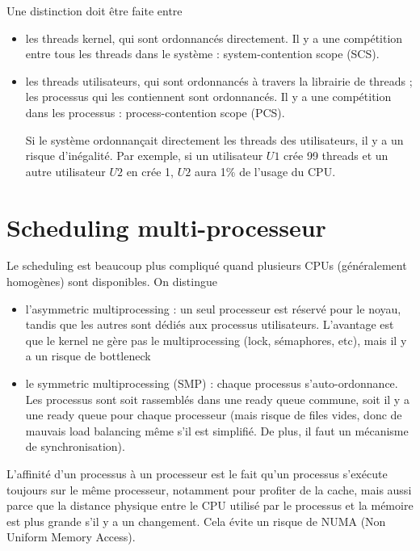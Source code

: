 Une distinction doit être faite entre

\begin{itemize}
	\item les threads kernel, qui sont ordonnancés directement. Il y a une compétition entre tous les threads dans le système : system-contention scope (SCS).
	\item les threads utilisateurs, qui sont ordonnancés à travers la librairie de threads ; les processus qui les contiennent sont ordonnancés. Il y a une compétition dans les processus : process-contention scope (PCS).
	
	Si le système ordonnançait directement les threads des utilisateurs, il y a un risque d'inégalité. Par exemple, si un utilisateur $U1$ crée 99 threads et un autre utilisateur $U2$ en crée 1, $U2$ aura 1\% de l'usage du CPU.
\end{itemize}

\section{Scheduling multi-processeur}

Le scheduling est beaucoup plus compliqué quand plusieurs CPUs (généralement homogènes) sont disponibles. On distingue

\begin{itemize}
	\item l'asymmetric multiprocessing : un seul processeur est réservé pour le noyau, tandis que les autres sont dédiés aux processus utilisateurs. L'avantage est que le kernel ne gère pas le multiprocessing (lock, sémaphores, etc), mais il y a un risque de bottleneck
	
	\item le symmetric multiprocessing (SMP) : chaque processus s'auto-ordonnance. Les processus sont soit rassemblés dans une ready queue commune, soit il y a une ready queue pour chaque processeur (mais risque de files vides, donc de mauvais load balancing même s'il est simplifié. De plus, il faut un mécanisme de synchronisation).
\end{itemize}

L'affinité d'un processus à un processeur est le fait qu'un processus s'exécute toujours sur le même processeur, notamment pour profiter de la cache, mais aussi parce que la distance physique entre le CPU utilisé par le processus et la mémoire est plus grande s'il y a un changement. Cela évite un risque de NUMA (Non Uniform Memory Access).

